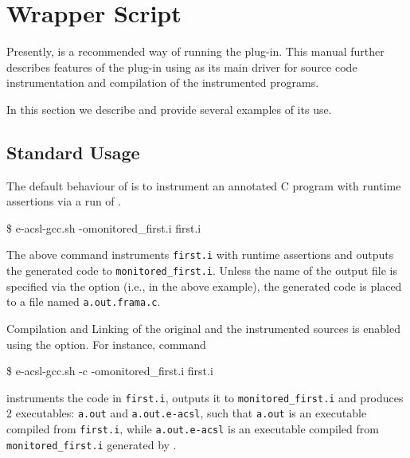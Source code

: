 \section{\eacsl Wrapper Script} %
\label{sec:wrapper}

\begin{important}
  Presently, \eacslgcc is a recommended way of running the \eacsl plug-in.
  This manual further describes features of the \eacsl plug-in using \eacslgcc
  as its main driver for source code instrumentation and compilation of the
  instrumented programs.
\end{important}

In this section we describe \eacslgcc and provide several examples of its use.

\subsection{Standard Usage}

The default behaviour of \eacslgcc is to instrument an annotated C program
with runtime assertions via a run of \framac.

\begin{frama-c-commands}
\$ e-acsl-gcc.sh -omonitored_first.i first.i
\end{frama-c-commands}

The above command instruments \texttt{first.i} with runtime assertions and
outputs the generated code to \texttt{monitored\_first.i}. Unless the name of
the output file is specified via the  option (i.e.,
 in the above example), the generated
code is placed to a file named \texttt{a.out.frama.c}.

Compilation and Linking of the original and the instrumented sources
is enabled using the  option.  For instance, command

\begin{frama-c-commands}
\$ e-acsl-gcc.sh -c -omonitored_first.i first.i
\end{frama-c-commands}

instruments the code in \texttt{first.i}, outputs it to
\texttt{monitored\_first.i} and produces 2 executables: \texttt{a.out} and
\texttt{a.out.e-acsl}, such that \texttt{a.out} is an executable compiled from
\texttt{first.i}, while \texttt{a.out.e-acsl} is an executable compiled from
\texttt{monitored\_first.i} generated by \eacsl.

